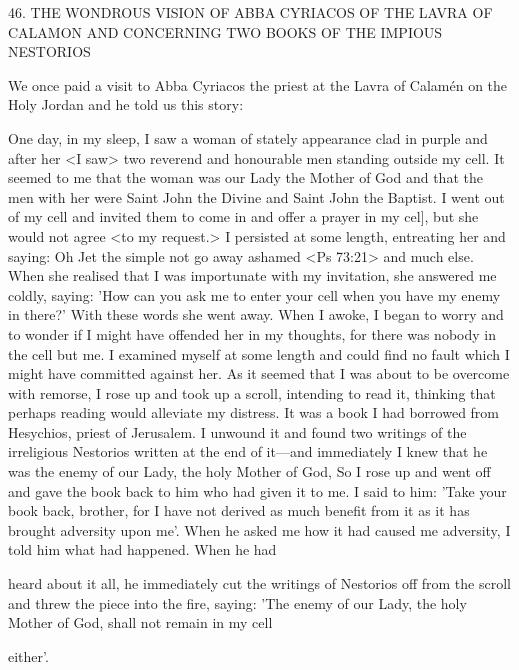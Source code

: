 46.
THE WONDROUS VISION OF ABBA CYRIACOS
OF THE LAVRA OF CALAMON AND
CONCERNING TWO BOOKS
OF THE IMPIOUS NESTORIOS

We once paid a visit to Abba Cyriacos the priest at the Lavra of
Calamén on the Holy Jordan and he told us this story:

One day, in my sleep, I saw a woman of stately appearance clad in
purple and after her <I saw> two reverend and honourable men
standing outside my cell.
It seemed to me that the woman was our
Lady the Mother of God and that the men with her were Saint John
the Divine and Saint John the Baptist.
I went out of my cell and
invited them to come in and offer a prayer in my cel], but she would
not agree <to my request.> I persisted at some length, entreating
her and saying: Oh Jet the simple not go away ashamed <Ps 73:21>
and much else.
When she realised that I was importunate with my
invitation, she answered me coldly, saying: 'How can you ask me to
enter your cell when you have my enemy in there?' With these
words she went away.
When I awoke, I began to worry and to
wonder if I might have offended her in my thoughts, for there was
nobody in the cell but me.
I examined myself at some length and
could find no fault which I might have committed against her.
As
it seemed that I was about to be overcome with remorse, I rose up
and took up a scroll, intending to read it, thinking that perhaps
reading would alleviate my distress.
It was a book I had borrowed
from Hesychios, priest of Jerusalem.
I unwound it and found two
writings of the irreligious Nestorios written at the end of it—and
immediately I knew that he was the enemy of our Lady, the holy
Mother of God, So I rose up and went off and gave the book back
to him who had given it to me.
I said to him: 'Take your book
back, brother, for I have not derived as much benefit from it as it
has brought adversity upon me'.
When he asked me how it had
caused me adversity, I told him what had happened.
When he had

heard about it all, he immediately cut the writings of Nestorios off
from the scroll and threw the piece into the fire, saying: 'The enemy
of our Lady, the holy Mother of God, shall not remain in my cell

either'.

